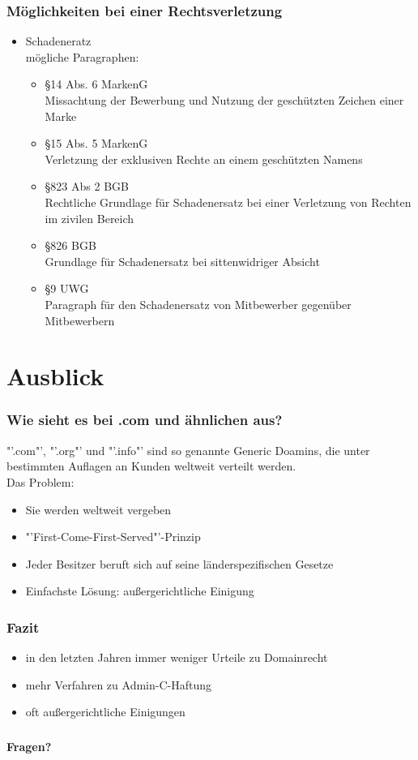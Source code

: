 \documentclass{beamer}
\begin{document}
	
	\begin{frame}
		\frametitle{Möglichkeiten bei einer Rechtsverletzung}
		\begin{itemize}
			\item Schadeneratz\\mögliche Paragraphen:
			\begin{itemize}
				\item §14 Abs. 6 MarkenG\\Missachtung der Bewerbung und Nutzung der geschützten Zeichen einer Marke
				\item §15 Abs. 5 MarkenG\\Verletzung der exklusiven Rechte an einem geschützten Namens
				\item §823 Abs 2 BGB\\Rechtliche Grundlage für Schadenersatz bei einer Verletzung von Rechten im zivilen Bereich
				\item §826 BGB\\Grundlage für Schadenersatz bei sittenwidriger Absicht
				\item §9 UWG\\Paragraph für den Schadenersatz von Mitbewerber gegenüber Mitbewerbern
			\end{itemize}
		\end{itemize}
	\end{frame}
	
	\section{Ausblick}
	
	\begin{frame}
		\frametitle{Wie sieht es bei .com und ähnlichen aus?}
		"'.com"', "'.org"' und "'.info"' sind so genannte Generic Doamins, die unter bestimmten Auflagen an Kunden weltweit verteilt werden.\\
		Das Problem:
		\begin{itemize}
			\item Sie werden weltweit vergeben
			\item "'First-Come-First-Served"'-Prinzip
			\item Jeder Besitzer beruft sich auf seine länderspezifischen Gesetze
			\item Einfachste Lösung: außergerichtliche Einigung
		\end{itemize}
	\end{frame}
	
	\begin{frame}
		\frametitle{Fazit}
		\begin{itemize}
			\item in den letzten Jahren immer weniger Urteile zu Domainrecht
			\item mehr Verfahren zu Admin-C-Haftung
			\item oft außergerichtliche Einigungen
		\end{itemize}
	\end{frame}
	
	\begin{frame}
		\frametitle{}
		\center
		\textbf{Fragen?}
	\end{frame}
	
\end{document}
